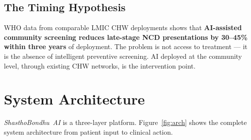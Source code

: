 \documentclass[12pt, a4paper]{article}
\newcommand{\sba}{\textit{ShasthoBondhu~AI}}
\begin{document}
\subsection{The Timing Hypothesis}

\begin{researchbox}
\small
WHO data from comparable LMIC CHW deployments shows that \textbf{AI-assisted community
screening reduces late-stage NCD presentations by 30--45\% within three years} of deployment.
The problem is not access to treatment — it is the absence of intelligent preventive screening.
AI deployed at the community level, through existing CHW networks, is the intervention point.
\end{researchbox}

\section{System Architecture}

\sba{} is a three-layer platform. Figure~\ref{fig:arch} shows the complete
system architecture from patient input to clinical action.
\end{document}
